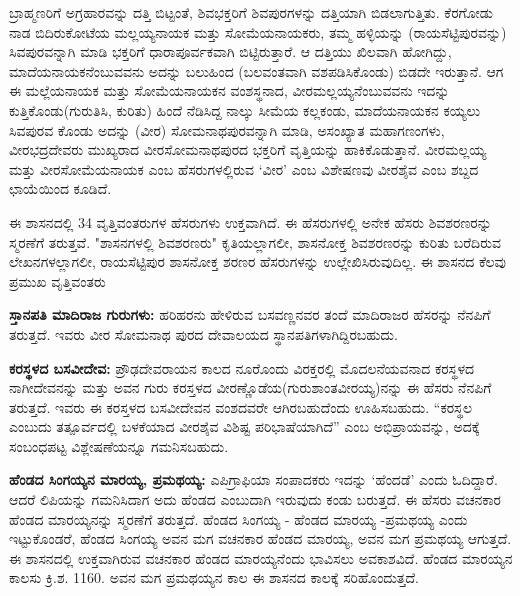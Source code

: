 ಬ್ರಾಹ್ಮಣರಿಗೆ ಅಗ್ರಹಾರವನ್ನು ದತ್ತಿ ಬಿಟ್ಟಂತೆ, ಶಿವಭಕ್ತರಿಗೆ ಶಿವಪುರಗಳನ್ನು ದತ್ತಿಯಾಗಿ ಬಿಡಲಾಗುತ್ತಿತು. ಕೆರಗೋಡು ನಾಡ ಬಿದಿರುಕೋಟೆಯ ಮಲ್ಲಯ್ಯನಾಯಕ ಮತ್ತು ಸೋಮೆಯನಾಯಕರು, ತಮ್ಮ ಹಳ್ಳಿಯನ್ನು (ರಾಯಸೆಟ್ಟಿಪುರವನ್ನು) ಸಿವಪುರವನ್ನಾಗಿ ಮಾಡಿ ಭಕ್ತರಿಗೆ ಧಾರಾಪೂರ್ವಕವಾಗಿ ಬಿಟ್ಟಿರುತ್ತಾರೆ. ಆ ದತ್ತಿಯು ಖಿಲವಾಗಿ ಹೋಗಿದ್ದು, ಮಾದೆಯನಾಯಕ\-ನೆಂಬುವವನು ಅದನ್ನು ಬಲುಹಿಂದ (ಬಲವಂತವಾಗಿ ವಶಪಡಿಸಿಕೊಂಡು) ಬಿಡದೇ ಇರುತ್ತಾನೆ. ಆಗ ಈ ಮಲ್ಲೆಯನಾಯಕ ಮತ್ತು ಸೋಮೆಯನಾಯಕನ ವಂಶಸ್ಥನಾದ, ವೀರಮಲ್ಲಯ್ಯನೆಂಬುವವನು ಇದನ್ನು ಕುತ್ತಿಕೊಂಡು(ಗುರುತಿಸಿ, ಕುರಿತು) ಹಿಂದೆ ನೆಡಿಸಿದ್ದ ನಾಲ್ಕು ಸೀಮೆಯ ಕಲ್ಲಕಂಡು, ಮಾದೆಯನಾಯಕನ ಕಯ್ಯಲು ಸಿವಪುರವ ಕೊಂಡು ಅದನ್ನು (ವೀರ) ಸೋಮನಾಥಪುರವನ್ನಾಗಿ ಮಾಡಿ, ಅಸಂಖ್ಯಾತ ಮಹಾಗಣಂಗಳು, ವೀರಭದ್ರದೇವರು ಮುಖ್ಯರಾದ ವೀರಸೋಮನಾಥಪುರದ ಭಕ್ತರಿಗೆ ವೃತ್ತಿಯನ್ನು ಹಾಕಿಕೊಡುತ್ತಾನೆ. ವೀರಮಲ್ಲಯ್ಯ ಮತ್ತು ವೀರಸೋಮೆಯನಾಯಕ ಎಂಬ ಹೆಸರುಗಳಲ್ಲಿರುವ ‘ವೀರ’ ಎಂಬ ವಿಶೇಷಣವು ವೀರಶೈವ ಎಂಬ ಶಬ್ದದ ಛಾಯೆಯಿಂದ ಕೂಡಿದೆ.

ಈ ಶಾಸನದಲ್ಲಿ 34 ವೃತ್ತಿವಂತರುಗಳ ಹೆಸರುಗಳು ಉಕ್ತವಾಗಿದೆ. ಈ ಹೆಸರುಗಳಲ್ಲಿ ಅನೇಕ ಹೆಸರು ಶಿವಶರಣರನ್ನು ಸ್ಮರಣೆಗೆ ತರುತ್ತವೆ. "ಶಾಸನಗಳಲ್ಲಿ ಶಿವಶರಣರು" ಕೃತಿಯಲ್ಲಾಗಲೀ, ಶಾಸನೋಕ್ತ ಶಿವಶರಣರನ್ನು ಕುರಿತು ಬರೆದಿರುವ ಲೇಖನಗಳಲ್ಲಾಗಲೀ, ರಾಯಸೆಟ್ಟಿಪುರ ಶಾಸನೋಕ್ತ ಶರಣರ ಹೆಸರುಗಳನ್ನು ಉಲ್ಲೇಖಿಸಿರುವುದಿಲ್ಲ. ಈ ಶಾಸನದ ಕೆಲವು ಪ್ರಮುಖ ವೃತ್ತಿವಂತರು

\textbf{ಸ್ತಾನಪತಿ ಮಾದಿರಾಜ ಗುರುಗಳು:} ಹರಿಹರನು ಹೇಳಿರುವ ಬಸವಣ್ಣನವರ ತಂದೆ ಮಾದಿರಾಜರ ಹೆಸರನ್ನು ನೆನಪಿಗೆ ತರುತ್ತದೆ. ಇವರು ವೀರ ಸೋಮನಾಥ ಪುರದ ದೇವಾಲಯದ ಸ್ಥಾನಪತಿಗಳಾಗಿದ್ದಿರಬಹುದು.

\textbf{ಕರಸ್ಥಳದ ಬಸವೀದೇವ: } ಪ್ರೌಢದೇವರಾಯನ ಕಾಲದ ನೂರೊಂದು ವಿರಕ್ತರಲ್ಲಿ ಮೊದಲನೆಯವನಾದ ಕರಸ್ಥಳದ ನಾಗೀದೇವನನ್ನು ಮತ್ತು ಅವನ ಗುರು ಕರಸ್ತಳದ ವೀರಣ್ಣೊಡೆಯ(ಗುರುಶಾಂತವೀರಯ್ಯ)ನನ್ನು ಈ ಹೆಸರು ನೆನಪಿಗೆ ತರುತ್ತದೆ. ಇವರು ಈ ಕರಸ್ತಳದ ಬಸವೀದೇವನ ವಂಶದವರೇ ಆಗಿರಬಹುದೆಂದು ಊಹಿಸಬಹುದು. “ಕರಸ್ಥಲ ಎಂಬುದು ತತ್ಪೂರ್ವದಲ್ಲಿ ಬಳಕೆಯಾದ ವೀರಶೈವ ವಿಶಿಷ್ಟ ಪರಿಭಾಷೆಯಾಗಿದೆ” ಎಂಬ ಅಭಿಪ್ರಾಯವನ್ನು, ಅದಕ್ಕೆ ಸಂಬಂಧಪಟ್ಟ ವಿಶ್ಲೇಷಣೆಯನ್ನೂ ಗಮನಿಸಬಹುದು.

\textbf{ಹೆಂಡದ ಸಿಂಗಯ್ಯನ ಮಾರಯ್ಯ, ಪ್ರಮಥಯ್ಯ:} ಎಪಿಗ್ರಾಫಿಯಾ ಸಂಪಾದಕರು ಇದನ್ನು ‘ಹೆಂದಡೆ’ ಎಂದು ಓದಿದ್ದಾರೆ. ಆದರೆ ಲಿಪಿಯನ್ನು ಗಮನಿಸಿದಾಗ ಅದು ಹೆಂಡದ ಎಂಬುದಾಗಿ ಇರುವುದು ಕಂಡು ಬರುತ್ತದೆ. ಈ ಹೆಸರು ವಚನಕಾರ ಹೆಂಡದ ಮಾರಯ್ಯನನ್ನು ಸ್ಮರಣೆಗೆ ತರುತ್ತದೆ. ಹೆಂಡದ ಸಿಂಗಯ್ಯ - ಹೆಂಡದ ಮಾರಯ್ಯ -ಪ್ರಮಥಯ್ಯ ಎಂದು ಇಟ್ಟುಕೊಂಡರೆ, ಹೆಂಡದ ಸಿಂಗಯ್ಯ ಅವನ ಮಗ ವಚನಕಾರ ಹೆಂಡದ ಮಾರಯ್ಯ, ಅವನ ಮಗ ಪ್ರಮಥಯ್ಯ ಆಗುತ್ತದೆ. ಈ ಶಾಸನದಲ್ಲಿ ಉಕ್ತವಾಗಿರುವ ವಚನಕಾರ ಹೆಂಡದ ಮಾರಯ್ಯನೆಂದು ಭಾವಿಸಲು ಅವಕಾಶವಿದೆ. ಹೆಂಡದ ಮಾರಯ್ಯನ ಕಾಲ\break ಸು ಕ್ರಿ.ಶ. 1160. ಅವನ ಮಗ ಪ್ರಮಥಯ್ಯನ ಕಾಲ ಈ ಶಾಸನದ ಕಾಲಕ್ಕೆ ಸರಿಹೊಂದುತ್ತದೆ.

